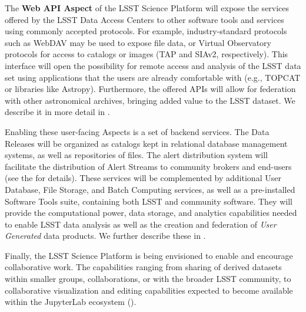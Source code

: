 The \textbf{Web API Aspect} of the LSST Science Platform will expose the
services offered by the LSST Data Access Centers to other software tools and
services using commonly accepted protocols. For example, industry-standard
protocols such as WebDAV may be used to expose file data, or Virtual Observatory
protocols for access to catalogs or images (TAP and SIAv2, respectively).
This interface will open the
possibility for remote access and analysis of the LSST data set using
applications that the users are already comfortable with (e.g., TOPCAT or libraries like Astropy).
Furthermore, the offered APIs will allow for federation
with other astronomical archives, bringing added value to the LSST dataset.
We describe it in more detail in .

Enabling these user-facing Aspects is a set of backend services.
The Data Releases will be organized as catalogs kept in relational database management systems, as well as repositories of files.
The alert distribution system will facilitate the distribution of Alert Streams to community brokers and end-users (see the \DPDD for details).
These services will be complemented by additional User Database, File Storage, and Batch Computing services, as well as a pre-installed Software Tools suite, containing both LSST and community software.
They will provide the computational power, data storage, and analytics capabilities needed to enable LSST data analysis as well as the creation and federation of \textit{User Generated} data products.
We further describe these in .

Finally, the LSST Science Platform is being envisioned to enable and encourage
collaborative work.  The capabilities ranging from sharing of derived
datasets within smaller groups, collaborations, or with the broader LSST
community, to collaborative visualization and editing capabilities expected
to become available within the JupyterLab ecosystem ().
